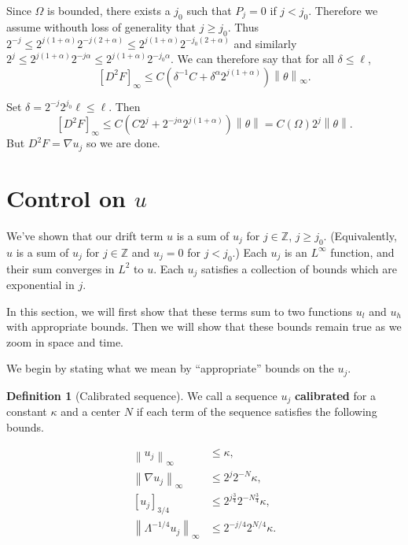 \documentclass[11pt]{amsart}
\theoremstyle{remark}
\theoremstyle{definition}
\newtheorem{definition}{Definition}
\newcommand{\Z}{\mathbb{Z}}
\newcommand{\norm}[1]{\left\lVert#1\right\rVert}
\newcommand{\paren}[1]{\left( #1 \right)}
\newcommand{\bracket}[1]{\left[ #1 \right]}
\newcommand{\grad}{\nabla}
\newcommand{\n}{^{-1}}
\newcommand{\ulow}{u_l}
\newcommand{\uhigh}{u_h}
\begin{document}
Since $\Omega$ is bounded, there exists a $j_0$ such that $P_j = 0$ if $j < j_0$.  Therefore we assume withouth loss of generality that $j \geq j_0$.  Thus $2^{-j} \leq 2^{j(1+\alpha)} 2^{-j(2+\alpha)} \leq 2^{j(1+\alpha)} 2^{-j_0(2+\alpha)}$ and similarly $2^j \leq 2^{j(1+\alpha)}2^{-j\alpha} \leq 2^{j(1+\alpha)} 2^{-j_0\alpha}$.  We can therefore say that for all $\delta \leq \ell$,
\[ \bracket{D^2 F}_\infty \leq C \paren{\delta\n C + \delta^\alpha 2^{j(1+\alpha)}} \norm{\theta}_\infty. \]

Set $\delta = 2^{-j} 2^{j_0} \ell \leq \ell$.  Then
\[ \bracket{D^2 F}_\infty \leq C \paren{C 2^j + 2^{-j\alpha} 2^{j(1+\alpha)}} \norm{\theta} = C(\Omega) 2^j \norm{\theta}. \]
But $D^2 F = \grad u_j$ so we are done.  



\section{Control on $u$}
We've shown that our drift term $u$ is a sum of $u_j$ for $j \in \Z$, $j \geq j_0$.  (Equivalently, $u$ is a sum of $u_j$ for $j \in \Z$ and $u_j = 0$ for $j < j_0$.)  Each $u_j$ is an $L^\infty$ function, and their sum converges in $L^2$ to $u$.  Each $u_j$ satisfies a collection of bounds which are exponential in $j$.  

In this section, we will first show that these terms sum to two functions $\ulow$ and $\uhigh$ with appropriate bounds.  Then we will show that these bounds remain true as we zoom in space and time.  

We begin by stating what we mean by ``appropriate'' bounds on the $u_j$.  
\begin{definition}[Calibrated sequence]
We call a sequence $u_j$ \textbf{calibrated} for a constant $\kappa$ and a center $N$ if each term of the sequence satisfies the following bounds.  

\begin{align*}
\norm{u_j}_\infty &\leq \kappa, \\
\norm{\grad u_j}_\infty &\leq 2^{j} 2^{-N} \kappa, \\
\bracket{u_j}_{3/4} &\leq 2^{j \frac{3}{4}} 2^{- N \frac{3}{4}} \kappa, \\
\norm{\Lambda^{-1/4} u_j}_\infty &\leq 2^{-j/4} 2^{N/4} \kappa.  
\end{align*} 

\end{definition}
\end{document}
